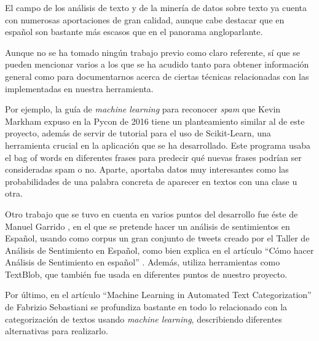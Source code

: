 
El campo de los análisis de texto y de la minería de datos sobre texto ya cuenta con numerosas aportaciones de gran calidad, aunque cabe destacar que en español son bastante más escasos que en el panorama angloparlante.

Aunque no se ha tomado ningún trabajo previo como claro referente, sí que se pueden mencionar varios a los que se ha acudido tanto para obtener información general como para documentarnos acerca de ciertas técnicas relacionadas con las implementadas en nuestra herramienta.

Por ejemplo, la guía de \emph{machine learning} para reconocer \emph{spam} que Kevin Markham expuso en la Pycon de 2016 \cite{spamtutorial} tiene un planteamiento similar al de este proyecto, además de servir de tutorial para el uso de Scikit-Learn, una herramienta crucial en la aplicación que se ha desarrollado. Este programa usaba el bag of words en diferentes frases para predecir qué nuevas frases podrían ser consideradas spam o no. Aparte, aportaba datos muy interesantes como las probabilidades de una palabra concreta de aparecer en textos con una clase u otra.

Otro trabajo que se tuvo en cuenta en varios puntos del desarrollo fue éste de Manuel Garrido \cite{tweetsmap}, en el que se pretende hacer un análisis de sentimientos en Español, usando como corpus un gran conjunto de tweets creado por el Taller de Análisis de Sentimiento en Español, como bien explica en el artículo ``Cómo hacer Análisis de Sentimiento en español'' \cite{spanishsentiment}. Además, utiliza herramientas como TextBlob, que también fue usada en diferentes puntos de nuestro proyecto.

Por último, en el artículo ``Machine Learning in Automated Text Categorization'' \cite{Sebastiani:2002:MLA:505282.505283} de Fabrizio Sebastiani se profundiza bastante en todo lo relacionado con la categorización de textos usando \emph{machine learning}, describiendo diferentes alternativas para realizarlo.